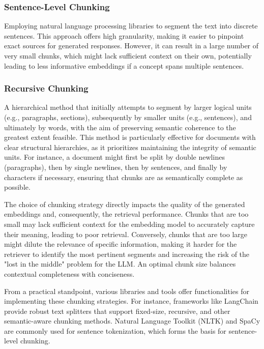 \subsubsection{Sentence-Level Chunking}
Employing natural language processing libraries to segment the text into discrete sentences. This approach offers high granularity, making it easier to pinpoint exact sources for generated responses. However, it can result in a large number of very small chunks, which might lack sufficient context on their own, potentially leading to less informative embeddings if a concept spans multiple sentences.

\subsubsection{Recursive Chunking}
A hierarchical method that initially attempts to segment by larger logical units (e.g., paragraphs, sections), subsequently by smaller units (e.g., sentences), and ultimately by words, with the aim of preserving semantic coherence to the greatest extent feasible. This method is particularly effective for documents with clear structural hierarchies, as it prioritizes maintaining the integrity of semantic units. For instance, a document might first be split by double newlines (paragraphs), then by single newlines, then by sentences, and finally by characters if necessary, ensuring that chunks are as semantically complete as possible.

The choice of chunking strategy directly impacts the quality of the generated embeddings and, consequently, the retrieval performance. Chunks that are too small may lack sufficient context for the embedding model to accurately capture their meaning, leading to poor retrieval. Conversely, chunks that are too large might dilute the relevance of specific information, making it harder for the retriever to identify the most pertinent segments and increasing the risk of the "lost in the middle" problem for the LLM. An optimal chunk size balances contextual completeness with conciseness.

From a practical standpoint, various libraries and tools offer functionalities for implementing these chunking strategies. For instance, frameworks like LangChain \autocite{langchain} provide robust text splitters that support fixed-size, recursive, and other semantic-aware chunking methods. Natural Language Toolkit (NLTK) \autocite{bird2009natural} and SpaCy \autocite{honnibal2015spacy} are commonly used for sentence tokenization, which forms the basis for sentence-level chunking.

